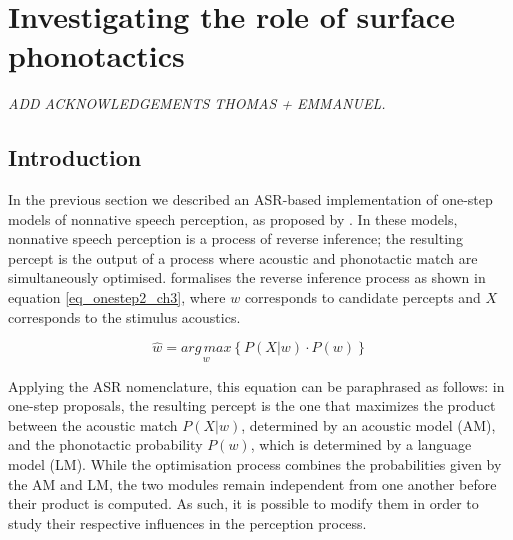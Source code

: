 
\newpage
\section{Investigating the role of surface phonotactics} \label{3-surfphono}

\small{\textit{{\color{red}ADD ACKNOWLEDGEMENTS THOMAS + EMMANUEL.\\}}}

\subsection{Introduction}

In the previous section we described an ASR-based implementation of one-step models of nonnative speech perception, as proposed by \cite{dupoux2011, wilson2013}. In these models, nonnative speech perception is a process of reverse inference; the resulting percept is the output of a process where acoustic and phonotactic match are simultaneously optimised. \cite{wilson2013} formalises the reverse inference process as shown in equation \ref{eq_onestep2_ch3}, where $w$ corresponds to candidate percepts and $X$ corresponds to the stimulus acoustics.

\begin{equation}
  \widehat{w} = \underset{w}{arg\,max} \left \{ P(X|w) \cdot P(w) \right \}
  \label{eq_onestep2_ch3}
\end{equation}

Applying the ASR nomenclature, this equation can be paraphrased as follows: in one-step proposals, the resulting percept is the one that maximizes the product between the acoustic match $P(X|w)$, determined by an acoustic model (AM), and the phonotactic probability  $P(w)$, which is determined by a language model (LM).
While the optimisation process combines the probabilities given by the AM and LM, the two modules remain independent from one another before their product is computed. As such, it is possible to modify them in order to study their respective influences in the perception process.   

